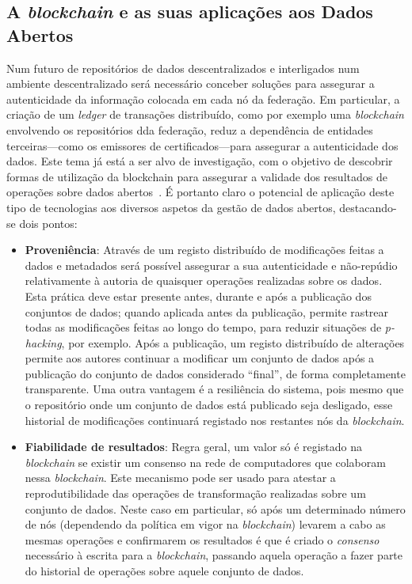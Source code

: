 \documentclass[sigconf,nonacm]{acmart}
\begin{document}

\subsection{A \emph{blockchain} e as suas aplicações aos Dados Abertos} %
\label{sub:a_emph_blockchain_e_as_suas_aplicacoes_aos_dados_abertos}

Num futuro de repositórios de dados descentralizados e interligados num ambiente descentralizado será necessário conceber soluções para assegurar a autenticidade da informação colocada em cada nó da federação. Em particular, a criação de um \emph{ledger} de transações distribuído, como por exemplo uma \emph{blockchain} envolvendo os repositórios dda federação, reduz a dependência de entidades terceiras---como os emissores de certificados---para assegurar a autenticidade dos dados. Este tema já está a ser alvo de investigação, com o objetivo de descobrir formas de utilização da blockchain para assegurar a validade dos resultados de operações sobre dados abertos~\cite{10.1007/978-3-030-23946-6_28}. É portanto claro o potencial de aplicação deste tipo de tecnologias aos diversos aspetos da gestão de dados abertos, destacando-se dois pontos:

\begin{itemize}
	\item \textbf{Proveniência}: Através de um registo distribuído de modificações feitas a dados e metadados será possível assegurar a sua autenticidade e não-repúdio relativamente à autoria de quaisquer operações realizadas sobre os dados. Esta prática deve estar presente antes, durante e após a publicação dos conjuntos de dados; quando aplicada antes da publicação, permite rastrear todas as modificações feitas ao longo do tempo, para reduzir situações de \emph{p-hacking}\cite{10.1371/journal.pbio.1002106}, por exemplo. Após a publicação, um registo distribuído de alterações permite aos autores continuar a modificar um conjunto de dados após a publicação do conjunto de dados considerado ``final'', de forma completamente transparente. Uma outra vantagem é a resiliência do sistema, pois mesmo que o repositório onde um conjunto de dados está publicado seja desligado, esse historial de modificações continuará registado nos restantes nós da \emph{blockchain}.
	\item \textbf{Fiabilidade de resultados}: Regra geral, um valor só é registado na \emph{blockchain} se existir um consenso na rede de computadores que colaboram nessa \emph{blockchain}. Este mecanismo pode ser usado para atestar a reprodutibilidade das operações de transformação realizadas sobre um conjunto de dados. Neste caso em particular, só após um determinado número de nós (dependendo da política em vigor na \emph{blockchain}) levarem a cabo as mesmas operações e confirmarem os resultados é que é criado o \emph{consenso} necessário à escrita para a \emph{blockchain}, passando aquela operação a fazer parte do historial de operações sobre aquele conjunto de dados. 
\end{itemize}
\end{document}
